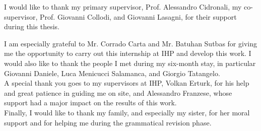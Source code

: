
I would like to thank my primary supervisor, Prof. Alessandro Cidronali, my co-supervisor, Prof. Giovanni Collodi, and Giovanni Lasagni, for their support during this thesis.

I am especially grateful to Mr. Corrado Carta and Mr. Batuhan Sutbas for giving me the opportunity to carry out this internship at IHP and develop this work. I would also like to thank the people I met during my six-month stay, in particular Giovanni Daniele, Luca Menicucci Salamanca, and Giorgio Tatangelo.\\
A special thank you goes to my supervisors at IHP, Volkan Erturk, for his help and great patience in guiding me on site, and Alessandro Franzese, whose support had a major impact on the results of this work.
\\

Finally, I would like to thank my family, and especially my sister, for her moral support and for helping me during the grammatical revision phase.



